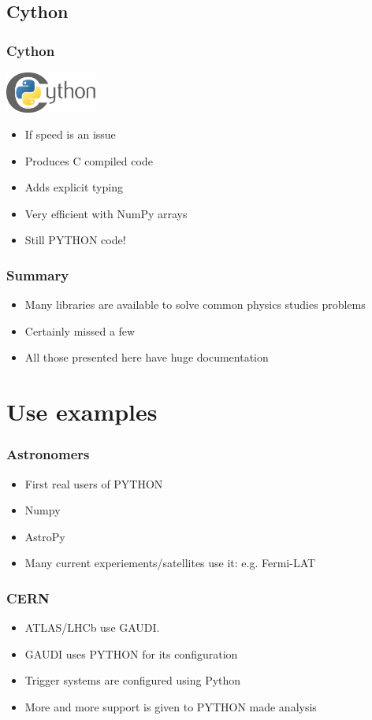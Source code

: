 \documentclass[14pt]{beamer}
\begin{document}
\subsection{Cython}
\begin{frame}
\frametitle{Cython}
\centering
\includegraphics[width=3cm]{Cython-logo.png}
\begin{itemize}
\item If speed is an issue
\item Produces C compiled code
\item Adds explicit typing
\item Very efficient with NumPy arrays
\item Still PYTHON code!
\end{itemize}
\end{frame}

\begin{frame}
\frametitle{Summary}
\begin{itemize}
\item Many libraries are available to solve common physics studies problems
\item Certainly missed a few
\item All those presented here have huge documentation
\end{itemize}
\end{frame}

\section{Use examples}

\begin{frame}
\frametitle{Astronomers}
\begin{itemize}
\item First real users of PYTHON
\item Numpy
\item AstroPy
\item Many current experiements/satellites use it: e.g. Fermi-LAT
\end{itemize}
\end{frame}

\begin{frame}
\frametitle{CERN}
\begin{itemize}
\item ATLAS/LHCb use GAUDI.
\item GAUDI uses PYTHON for its configuration
\item Trigger systems are configured using Python
\item More and more support is given to PYTHON made analysis
\end{itemize}
\end{frame}
\end{document}
